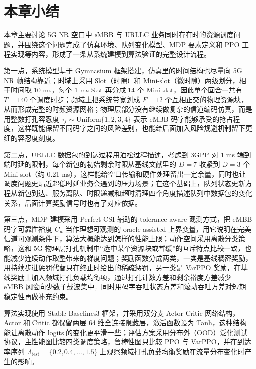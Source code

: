 \section{本章小结}\label{35-ux672cux7ae0ux5c0fux7ed3}


本章主要讨论 5G NR 空口中 eMBB 与 URLLC 业务同时存在时的资源调度问题，并围绕这个问题完成了仿真环境、队列变化模型、MDP 要素定义和 PPO 工程实现等内容，形成了一条从系统建模到算法验证的完整设计流程\cite{saggese2021}。

第一点，系统模型基于 Gymnasium 框架搭建，仿真里的时间结构也尽量向 5G NR 帧结构靠近；时域上采用 Slot（时隙）和 Mini-slot（微时隙）两级划分，相干时间取 10 ms，每个 1 ms Slot 再分成 14 个 Mini-slot，因此单个回合一共有 \(T = 140\) 个调度时步；频域上把系统带宽划成 \(F = 12\) 个互相正交的物理资源块，从而形成完整的时频资源网格；物理层部分没有继续做复杂的信道编码仿真，而是用整数打孔容忍度 \(\tau_f \sim \text{Uniform}\{1,2,3,4\}\) 表示 eMBB 码字能够承受的抢占程度，这样既能保留不同码字之间的风险差别，也能给后面加入风险规避机制留下更细的容忍度刻度。

第二点，URLLC 数据包的到达过程用泊松过程描述，考虑到 3GPP 对 1 ms 端到端时延的限制，每个新包的初始剩余时限从基线文献里的 \(D=7\) 收紧到 \(D=3\) 个 Mini-slot（约 0.21 ms），这样能给空口传输和硬件处理留出一定余量，同时也让调度问题更贴近超低时延业务会遇到的压力场景；在这个基础上，队列状态更新方程从新包到达、服务离队、时限递减和超时清理四个角度描述队列中数据包的变化关系，后面计算奖励信号时也有了对应依据\cite{alsenwi2021}。

第三点，MDP 建模采用 Perfect-CSI 辅助的 tolerance-aware 观测方式，把 eMBB 码字可靠性裕度 \(C_w\) 当作理想可观测的 oracle-assisted 上界变量，用它说明在完美信道可观测条件下，算法大概能达到怎样的性能上限；动作空间采用离散分类策略，这和 5G 物理层打孔机制中“选中某个资源块或暂缓”的互斥特点比较一致，也能减少连续动作取整带来的梯度问题；奖励函数分成两类，一类是基线稠密奖励，用持续步进惩罚代替只在终止时给出的稀疏惩罚，另一类是 VarPPO 奖励，在基线奖励上加入频域打孔负载均衡项，通过打孔计数方差和剩余裕度方差减少 eMBB 风险向少数子载波集中，同时用码字吞吐状态方差和滚动吞吐方差对短期稳定性再做补充约束\cite{alsenwi2021}。

算法实现使用 Stable-Baselines3 框架，并采用双分支 Actor-Critic 网络结构，Actor 和 Critic 都保留两层 64 维全连接隐藏层，激活函数设为 Tanh，这种结构能让离散动作 logits 的变化更平滑一些；评估方案采用分布外（OOD）泛化测试协议，主性能图比较四类调度策略，鲁棒性图只比较 PPO 与 VarPPO，并在到达率序列 \(\Lambda_{\text{test}} = \{0.2, 0.4, \ldots, 1.5\}\) 上观察频域打孔负载均衡奖励在流量分布变化时产生的影响\cite{saggese2021}。


